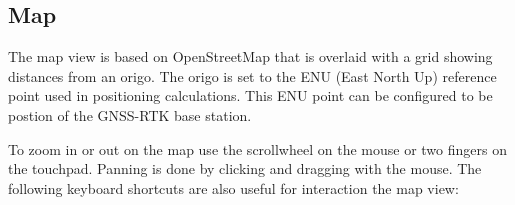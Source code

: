\documentclass[12pt]{article} %
\def\printtodos{0}
\newcommand{\todo}[1]{
  \if\printtodos1
      {\color{red} \textbf{TODO:} #1}
  \fi}
\begin{document}



\subsection{Map}

The map view is based on OpenStreetMap that is overlaid with a grid
showing distances from an origo. The origo is set to the ENU (East
North Up) reference point used in positioning calculations. This ENU
point can be configured to be postion of the GNSS-RTK base station.

To zoom in or out on the map use the scrollwheel on the mouse or two
fingers on the touchpad. Panning is done by clicking and dragging
with the mouse. The following keyboard shortcuts are also useful for
interaction the map view:
\end{document}
